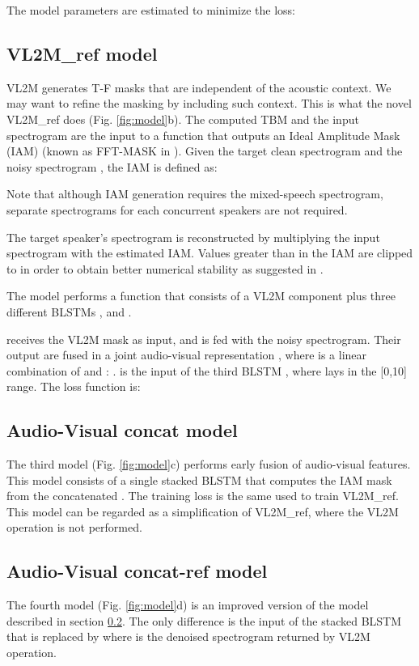 \documentclass{article}
\begin{document}
The model parameters are estimated to minimize the loss:


\subsection{VL2M\_ref model}
\label{ssec:full_model}
VL2M generates T-F masks that are independent of the acoustic context. We may want to refine the masking by including such context.
This is what the novel VL2M\_ref does (Fig. \ref{fig:model}b). The computed TBM  and the input spectrogram  are the input to a function that outputs an Ideal Amplitude Mask (IAM)  (known as FFT-MASK in \cite{yuxuan_wang_training_2014}). Given the target clean spectrogram  and the noisy spectrogram , the IAM is defined as:

Note that although IAM generation requires the mixed-speech spectrogram, separate spectrograms for each concurrent speakers are not required.

The target speaker's  spectrogram  is reconstructed by multiplying the input spectrogram with the estimated IAM. Values greater than  in the IAM are clipped to  in order to obtain better numerical stability as suggested in \cite{yuxuan_wang_training_2014}. 

The model performs a function  that consists of a VL2M component plus three different BLSTMs ,  and . 

 receives the VL2M mask  as input, and  is fed with the noisy spectrogram.
Their output  are fused in a joint audio-visual representation 
, where  is a linear combination of  and : .
 is the input of the third BLSTM , where  lays in the [0,10] range.
The loss function is:


\subsection{Audio-Visual concat model}
\label{ssub:concat_model}
The third model (Fig. \ref{fig:model}c) performs early fusion of audio-visual features. This model consists of a single stacked BLSTM that computes the IAM mask  from the concatenated . The training loss is the same  used to train VL2M\_ref. This model can be regarded as a simplification of VL2M\_ref, where the VL2M operation is not performed.

\subsection{Audio-Visual concat-ref model}
\label{ssub:concat_ref_model}
The fourth model (Fig. \ref{fig:model}d) is an improved version of the model described in section \ref{ssub:concat_model}. The only difference is the input of the stacked BLSTM that is replaced by  where  is the denoised spectrogram returned by VL2M operation.
\end{document}
